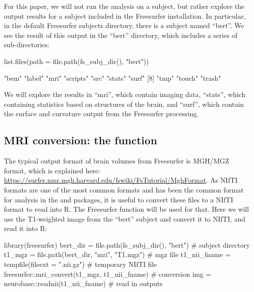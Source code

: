 For this paper, we will not run the analysis on a subject, but rather
explore the output results for a subject included in the Freesurfer
installation. In particular, in the default Freesurfer subjects
directory, there is a subject named ``bert''. We see the result of this
output in the ``bert'' directory, which includes a series of
sub-directories:

\begin{Schunk}
\begin{Sinput}
list.files(path  = file.path(fs_subj_dir(), "bert"))
\end{Sinput}
\begin{Soutput}
 [1] "bem"     "label"   "mri"     "scripts" "src"     "stats"   "surf"   
 [8] "tmp"     "touch"   "trash"  
\end{Soutput}
\end{Schunk}

We will explore the results in ``mri'', which contain imaging data,
``stats'', which containing statistics based on structures of the brain,
and ``surf'', which contain the surface and curvature output from the
Freesurfer processing.

\subsection{\texorpdfstring{MRI conversion: the 
function}{MRI conversion: the  function}}\label{mri-conversion-the-function}

The typical output format of brain volumes from Freesurfer is MGH/MGZ
format, which is explained here:
\url{https://surfer.nmr.mgh.harvard.edu/fswiki/FsTutorial/MghFormat}. As
NIfTI formats are one of the most common formats and has been the common
format for analysis in the  and  packages,
it is useful to convert these files to a NIfTI format to read into R.
The  Freesurfer function will be used for that. Here
we will use the T1-weighted image from the ``bert'' subject and convert
it to NIfTI, and read it into R:

\begin{Schunk}
\begin{Sinput}
library(freesurfer)
bert_dir = file.path(fs_subj_dir(), "bert") # subject directory
t1_mgz = file.path(bert_dir, "mri", "T1.mgz") # mgz file
t1_nii_fname = tempfile(fileext = ".nii.gz") # temporary NIfTI file
freesurfer::mri_convert(t1_mgz, t1_nii_fname) # conversion
img = neurobase::readnii(t1_nii_fname) # read in outputs
\end{Sinput}
\end{Schunk}

